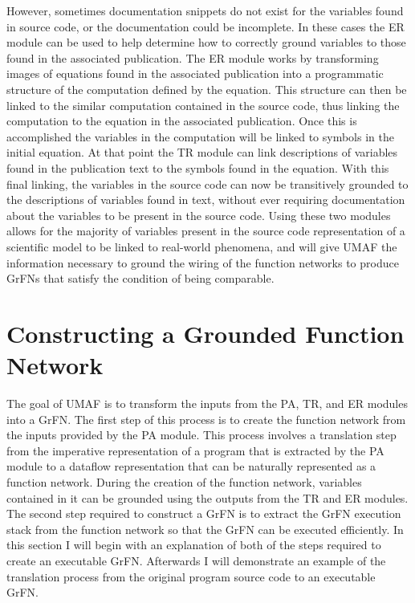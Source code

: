 However, sometimes documentation snippets do not exist for the variables found in source code, or the documentation could be incomplete.
In these cases the ER module can be used to help determine how to correctly ground variables to those found in the associated publication.
The ER module works by transforming images of equations found in the associated publication into a programmatic structure of the computation defined by the equation.
This structure can then be linked to the similar computation contained in the source code, thus linking the computation to the equation in the associated publication.
Once this is accomplished the variables in the computation will be linked to symbols in the initial equation.
At that point the TR module can link descriptions of variables found in the publication text to the symbols found in the equation.
With this final linking, the variables in the source code can now be transitively grounded to the descriptions of variables found in text, without ever requiring documentation about the variables to be present in the source code.
Using these two modules allows for the majority of variables present in the source code representation of a scientific model to be linked to real-world phenomena, and will give UMAF the information necessary to ground the wiring of the function networks to produce GrFNs that satisfy the condition of being comparable.

\section{Constructing a Grounded Function Network \label{sec:grfn_assembly}}
The goal of UMAF is to transform the inputs from the PA, TR, and ER modules into a GrFN.
The first step of this process is to create the function network from the inputs provided by the PA module.
This process involves a translation step from the imperative representation of a program that is extracted by the PA module to a dataflow representation that can be naturally represented as a function network.
During the creation of the function network, variables contained in it can be grounded using the outputs from the TR and ER modules.
The second step required to construct a GrFN is to extract the GrFN execution stack from the function network so that the GrFN can be executed efficiently.
In this section I will begin with an explanation of both of the steps required to create an executable GrFN.
Afterwards I will demonstrate an example of the translation process from the original program source code to an executable GrFN.

